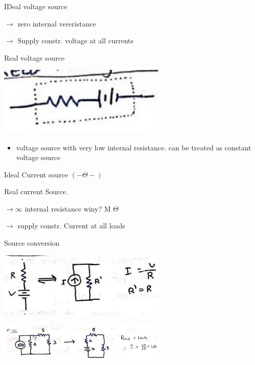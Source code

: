 \documentclass[12pt, a4paper]{article}
\newcommand{\figwidth}{8cm}
\begin{document}
IDeal voltage source

$\rightarrow$ zero internal vereristance

$\rightarrow$ Supply constr. voltage at all currents

Real voltage source

\begin{center}
	\includegraphics[max width=\figwidth]{2024_06_15_f9b8f5fbbfa74e15de4eg-6}
\end{center}

\begin{itemize}
	\item voltage source with very low internal resistance. can be treated as constant voltage source
\end{itemize}

Ideal Current source $(-\Theta-)$

Real current Source.

$\rightarrow \infty$ internal resistance winy? M $\Theta$

$\rightarrow$ supply constr. Current at all loads

Source conversion

\begin{center}
	\includegraphics[max width=\figwidth]{2024_06_15_f9b8f5fbbfa74e15de4eg-6(3)}
\end{center}

\begin{center}
	\includegraphics[max width=\figwidth]{2024_06_15_f9b8f5fbbfa74e15de4eg-6(5)}
\end{center}
\end{document}
